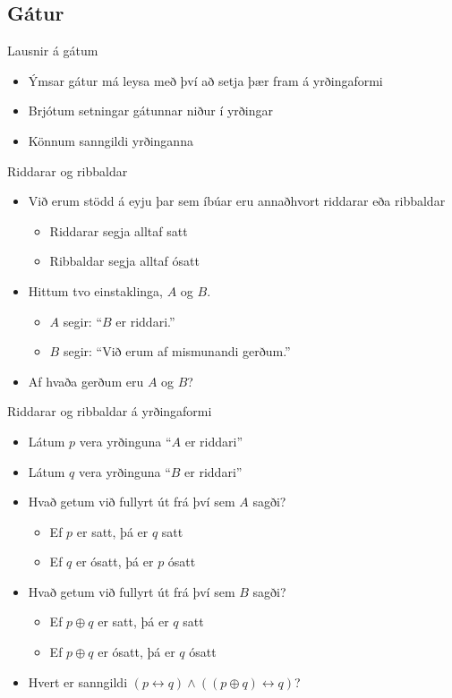 \documentclass{beamer}
\begin{document}
\subsection{Gátur}

\begin{frame}{Lausnir á gátum}
\begin{itemize}
 \item Ýmsar gátur má leysa með því að setja þær fram á yrðingaformi
 \item Brjótum setningar gátunnar niður í yrðingar
 \item Könnum sanngildi yrðinganna
\end{itemize}
\end{frame}

\begin{frame}{Riddarar og ribbaldar}
\begin{itemize}
 \item Við erum stödd á eyju þar sem íbúar eru annaðhvort riddarar eða ribbaldar\pause
 \begin{itemize}
  \item Riddarar segja alltaf satt
  \item Ribbaldar segja alltaf ósatt
 \end{itemize}
 \item Hittum tvo einstaklinga, $A$ og $B$. 
 \begin{itemize}
  \item $A$ segir: ``$B$ er riddari.''
  \item $B$ segir: ``Við erum af mismunandi gerðum.''
 \end{itemize}
 \item Af hvaða gerðum eru $A$ og $B$?
\end{itemize}
\end{frame}

\begin{frame}{Riddarar og ribbaldar á yrðingaformi}
\begin{itemize}
 \item Látum $p$ vera yrðinguna ``$A$ er riddari''
 \item Látum $q$ vera yrðinguna ``$B$ er riddari''
 \item Hvað getum við fullyrt út frá því sem $A$ sagði? \pause
 \begin{itemize}
  \item Ef $p$ er satt, þá er $q$ satt
  \item Ef $q$ er ósatt, þá er $p$ ósatt
 \end{itemize}
 \item Hvað getum við fullyrt út frá því sem $B$ sagði? \pause
 \begin{itemize}
  \item Ef $p \oplus q$ er satt, þá er $q$ satt
  \item Ef $p \oplus q$ er ósatt, þá er $q$ ósatt
 \end{itemize}
 \item Hvert er sanngildi $(p \leftrightarrow q) \land ((p \oplus q) \leftrightarrow q)$?
\end{itemize}
\end{frame}
\end{document}
